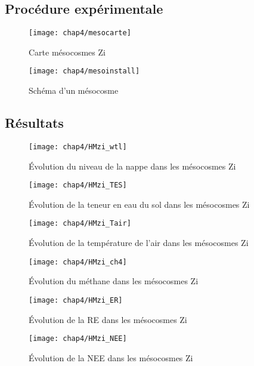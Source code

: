 \subsection{Procédure expérimentale}

\begin{figure}
\centering
\texttt{[image: chap4/mesocarte]}
\caption{Carte mésocosmes Zi}
\label{fig:mesocarte}
\end{figure}

\begin{figure}
\centering
\texttt{[image: chap4/mesoinstall]}
\caption{Schéma d'un mésocosme}
\label{fig:mesoinstall}
\end{figure}

\subsection{Résultats}

\begin{figure}
\centering
\texttt{[image: chap4/HMzi\_wtl]}
\caption{Évolution du niveau de la nappe dans les mésocosmes Zi}
\label{fig:HMzi_wtl}
\end{figure}

\begin{figure}
\centering
\texttt{[image: chap4/HMzi\_TES]}
\caption{Évolution de la teneur en eau du sol dans les mésocosmes Zi}
\label{fig:HMzi_TES}
\end{figure}

\begin{figure}
\centering
\texttt{[image: chap4/HMzi\_Tair]}
\caption{Évolution de la température de l'air dans les mésocosmes Zi}
\label{fig:HMzi_Tair}
\end{figure}

\begin{figure}
\centering
\texttt{[image: chap4/HMzi\_ch4]}
\caption{Évolution du méthane dans les mésocosmes Zi}
\label{fig:HMzi_ch4}
\end{figure}

\begin{figure}
\centering
\texttt{[image: chap4/HMzi\_ER]}
\caption{Évolution de la RE dans les mésocosmes Zi}
\label{fig:HMzi_ER}
\end{figure}

\begin{figure}
\centering
\texttt{[image: chap4/HMzi\_NEE]}
\caption{Évolution de la NEE dans les mésocosmes Zi}
\label{fig:HMzi_NEE}
\end{figure}


